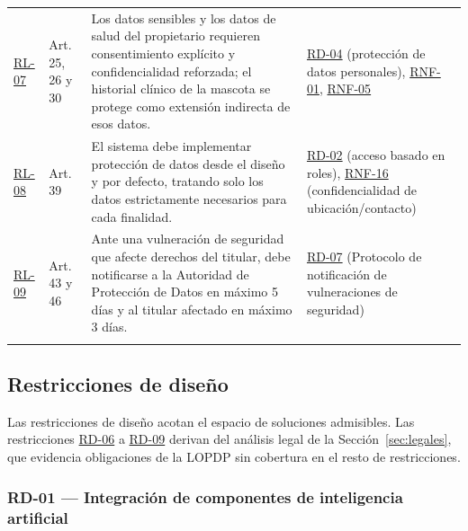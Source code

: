 \documentclass[journal,onecolumn]{IEEEtran}
\begin{document}
\begin{table}[H]
\begin{tabularx}{\textwidth}{@{}p{1.1cm} p{1.9cm} p{5.4cm} X@{}}
			\addlinespace
			\hyperref[rl:07]{RL-07}\label{rl:07} & Art. 25, 26 y 30 & Los datos sensibles y los datos de salud del propietario requieren consentimiento explícito y confidencialidad reforzada; el historial clínico de la mascota se protege como extensión indirecta de esos datos. & \hyperref[tab:RD-04]{RD-04} (protección de datos personales), \hyperref[tab:RNF-01]{RNF-01}, \hyperref[tab:RNF-05]{RNF-05} \\
			\addlinespace
			\hyperref[rl:08]{RL-08}\label{rl:08} & Art. 39 & El sistema debe implementar protección de datos desde el diseño y por defecto, tratando solo los datos estrictamente necesarios para cada finalidad. & \hyperref[tab:RD-02]{RD-02} (acceso basado en roles), \hyperref[tab:RNF-16]{RNF-16} (confidencialidad de ubicación/contacto) \\
			\addlinespace
			\hyperref[rl:09]{RL-09}\label{rl:09} & Art. 43 y 46 & Ante una vulneración de seguridad que afecte derechos del titular, debe notificarse a la Autoridad de Protección de Datos en máximo 5 días y al titular afectado en máximo 3 días. & \hyperref[tab:RD-07]{RD-07} (Protocolo de notificación de vulneraciones de seguridad) \\
			\addlinespace
			\bottomrule
		\end{tabularx}
	\end{table}
	
	\newpage
	\subsection{Restricciones de diseño}
	\label{sec:restricciones}
	
	Las restricciones de diseño acotan el espacio de soluciones admisibles.
	Las restricciones \hyperref[tab:RD-06]{RD-06} a \hyperref[tab:RD-09]{RD-09} derivan del análisis legal de la
	Sección~\ref{sec:legales}, que evidencia obligaciones de la LOPDP sin
	cobertura en el resto de restricciones.
	
	\subsubsection{RD-01 --- Integración de componentes de inteligencia artificial}
	
\end{document}
